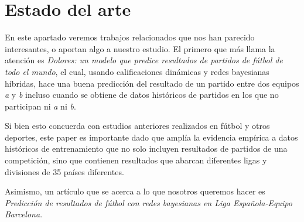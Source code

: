 \chapter{Estado del arte}

En este apartado veremos trabajos relacionados que 
nos han parecido interesantes, o aportan algo a 
nuestro estudio. El primero que más llama la atención es 
\textit{Dolores: un modelo que predice resultados de
partidos de fútbol de todo el mundo}\cite{dolores}, el 
cual, usando calificaciones dinámicas y redes bayesianas 
híbridas, hace una buena predicción del resultado de un partido 
entre dos equipos \textit{a} y \textit{b} incluso cuando 
se obtiene de datos históricos de partidos 
en los que no participan ni \textit{a} ni \textit{b}.

Si bien esto concuerda con estudios anteriores realizados 
en fútbol y otros deportes, este paper es importante dado que 
amplía la evidencia empírica a datos históricos de entrenamiento 
que no solo incluyen resultados de partidos de una competición, 
sino que contienen resultados que abarcan diferentes ligas y 
divisiones de 35 países diferentes.

Asimismo, un artículo que se acerca a lo que nosotros queremos 
hacer es \textit{Predicción de resultados de fútbol con redes bayesianas en
Liga Española-Equipo Barcelona}\cite{prediction-barcelona}.